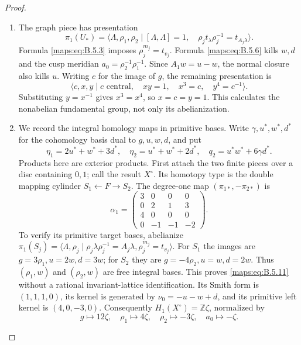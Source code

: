 \begin{proof}
\begin{enumerate}[label=\arabic*.,leftmargin=*]
\item The graph piece has presentation
\[
 \pi_1(U_*)=
 \langle\Lambda,\rho_1,\rho_2\mid
 [\Lambda,\Lambda]=1,\quad
 \rho_jt_\lambda\rho_j^{-1}=t_{A_j\lambda}\rangle.
\]
Formula \eqref{maps:eq:B.5.3} imposes $\rho_j^{m_j}=t_{v_j}$.
Formula \eqref{maps:eq:B.5.6} kills $w,d$ and the cusp meridian
$a_0=\rho_2^{-1}\rho_1^{-1}$.  Since $A_1w=u-w$,
the normal closure also kills $u$.  Writing $c$ for
the image of $g$, the remaining presentation is
\[
 \langle c,x,y\mid c\text{ central},\quad
 xy=1,\quad x^3=c,\quad y^4=c^{-1}\rangle.
 \tag{B.5.9}\label{maps:eq:B.5.9}
\]
Substituting $y=x^{-1}$ gives $x^3=x^4$, so $x=c=y=1$.
This calculates the nonabelian fundamental group,
not only its abelianization.

\item We record the integral homology maps in primitive
bases.  Write $\gamma,u^*,w^*,d^*$ for the cohomology
basis dual to $g,u,w,d$, and put
\[
 \eta_1=2u^*+w^*+3d^*,\quad
 \eta_2=u^*+w^*+2d^*,\quad
 q_2=u^*w^*+6\gamma d^*.
 \tag{B.5.10}\label{maps:eq:B.5.10}
\]
Products here are exterior products.  First attach
the two finite pieces over a disc containing $0,1$;
call the result $X^\circ$.  Its homotopy type is the
double mapping cylinder $S_1\leftarrow F\to S_2$.
The degree-one
map $(\pi_{1*},-\pi_{2*})$ is
\[
 \alpha_1=
 \begin{pmatrix}
 3&0&0&0\\0&2&1&3\\4&0&0&0\\0&-1&-1&-2
 \end{pmatrix}.
 \tag{B.5.11}\label{maps:eq:B.5.11}
\]
To verify its primitive target bases, abelianize
$\pi_1(S_j)=\langle\Lambda,\rho_j\mid
\rho_j\lambda\rho_j^{-1}=A_j\lambda,
\rho_j^{m_j}=t_{v_j}\rangle$.
For $S_1$ the images are
$g=3\rho_1,u=2w,d=3w$; for $S_2$ they are
$g=-4\rho_2,u=w,d=2w$.  Thus
$(\rho_1,w)$ and $(\rho_2,w)$ are free integral bases.
This proves \eqref{maps:eq:B.5.11} without a rational invariant-lattice
identification.  Its Smith form is $(1,1,1,0)$,
its kernel is generated by
$\nu_0=-u-w+d$, and its primitive left kernel is
$(4,0,-3,0)$.  Consequently
$H_1(X^\circ)=\mathbb Z\zeta$, normalized by
\[
 g\mapsto12\zeta,\quad
 \rho_1\mapsto4\zeta,\quad
 \rho_2\mapsto-3\zeta,\quad
 a_0\mapsto-\zeta.
 \tag{B.5.12}\label{maps:eq:B.5.12}
\]


\end{enumerate}
\end{proof}
